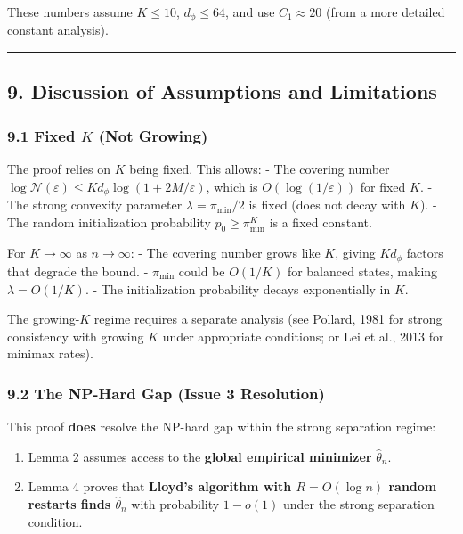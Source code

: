 \documentclass[
  12pt,
]{article}
\providecommand{\tightlist}{%
  \setlength{\itemsep}{0pt}\setlength{\parskip}{0pt}}
\begin{document}
These numbers assume \(K \leq 10\), \(d_\phi \leq 64\), and use
\(C_1 \approx 20\) (from a more detailed constant analysis).

\begin{center}\rule{0.5\linewidth}{0.5pt}\end{center}

\subsection{9. Discussion of Assumptions and
Limitations}\label{discussion-of-assumptions-and-limitations}

\subsubsection{\texorpdfstring{9.1 Fixed \(K\) (Not
Growing)}{9.1 Fixed K (Not Growing)}}\label{fixed-k-not-growing}

The proof relies on \(K\) being fixed. This allows: - The covering
number
\(\log \mathcal{N}(\varepsilon) \leq K d_\phi \log(1 + 2M/\varepsilon)\),
which is \(O(\log(1/\varepsilon))\) for fixed \(K\). - The strong
convexity parameter \(\lambda = \pi_{\min}/2\) is fixed (does not decay
with \(K\)). - The random initialization probability
\(p_0 \geq \pi_{\min}^K\) is a fixed constant.

For \(K \to \infty\) as \(n \to \infty\): - The covering number grows
like \(K\), giving \(K d_\phi\) factors that degrade the bound. -
\(\pi_{\min}\) could be \(O(1/K)\) for balanced states, making
\(\lambda = O(1/K)\). - The initialization probability decays
exponentially in \(K\).

The growing-\(K\) regime requires a separate analysis (see Pollard, 1981
for strong consistency with growing \(K\) under appropriate conditions;
or Lei et al., 2013 for minimax rates).

\subsubsection{9.2 The NP-Hard Gap (Issue 3
Resolution)}\label{the-np-hard-gap-issue-3-resolution}

This proof \textbf{does} resolve the NP-hard gap within the strong
separation regime:

\begin{enumerate}
\def\labelenumi{\arabic{enumi}.}
\tightlist
\item
  Lemma 2 assumes access to the \textbf{global empirical minimizer}
  \(\hat{\theta}_n\).
\item
  Lemma 4 proves that \textbf{Lloyd's algorithm with \(R = O(\log n)\)
  random restarts finds \(\hat{\theta}_n\)} with probability
  \(1 - o(1)\) under the strong separation condition.
\end{enumerate}
\end{document}
